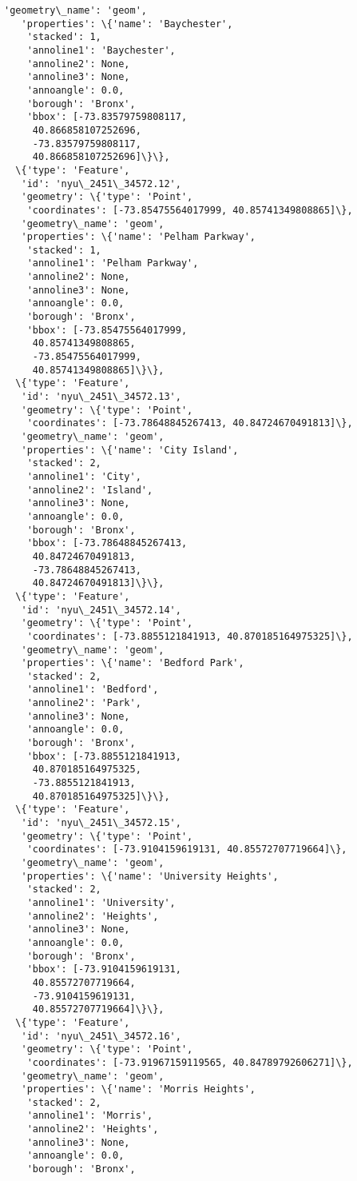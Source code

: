 \documentclass[11pt]{article}
\begin{document}
\begin{tcolorbox}[breakable, size=fbox, boxrule=.5pt, pad at break*=1mm, opacityfill=0]
\begin{Verbatim}[commandchars=\\\{\}]
   'geometry\_name': 'geom',
   'properties': \{'name': 'Baychester',
    'stacked': 1,
    'annoline1': 'Baychester',
    'annoline2': None,
    'annoline3': None,
    'annoangle': 0.0,
    'borough': 'Bronx',
    'bbox': [-73.83579759808117,
     40.866858107252696,
     -73.83579759808117,
     40.866858107252696]\}\},
  \{'type': 'Feature',
   'id': 'nyu\_2451\_34572.12',
   'geometry': \{'type': 'Point',
    'coordinates': [-73.85475564017999, 40.85741349808865]\},
   'geometry\_name': 'geom',
   'properties': \{'name': 'Pelham Parkway',
    'stacked': 1,
    'annoline1': 'Pelham Parkway',
    'annoline2': None,
    'annoline3': None,
    'annoangle': 0.0,
    'borough': 'Bronx',
    'bbox': [-73.85475564017999,
     40.85741349808865,
     -73.85475564017999,
     40.85741349808865]\}\},
  \{'type': 'Feature',
   'id': 'nyu\_2451\_34572.13',
   'geometry': \{'type': 'Point',
    'coordinates': [-73.78648845267413, 40.84724670491813]\},
   'geometry\_name': 'geom',
   'properties': \{'name': 'City Island',
    'stacked': 2,
    'annoline1': 'City',
    'annoline2': 'Island',
    'annoline3': None,
    'annoangle': 0.0,
    'borough': 'Bronx',
    'bbox': [-73.78648845267413,
     40.84724670491813,
     -73.78648845267413,
     40.84724670491813]\}\},
  \{'type': 'Feature',
   'id': 'nyu\_2451\_34572.14',
   'geometry': \{'type': 'Point',
    'coordinates': [-73.8855121841913, 40.870185164975325]\},
   'geometry\_name': 'geom',
   'properties': \{'name': 'Bedford Park',
    'stacked': 2,
    'annoline1': 'Bedford',
    'annoline2': 'Park',
    'annoline3': None,
    'annoangle': 0.0,
    'borough': 'Bronx',
    'bbox': [-73.8855121841913,
     40.870185164975325,
     -73.8855121841913,
     40.870185164975325]\}\},
  \{'type': 'Feature',
   'id': 'nyu\_2451\_34572.15',
   'geometry': \{'type': 'Point',
    'coordinates': [-73.9104159619131, 40.85572707719664]\},
   'geometry\_name': 'geom',
   'properties': \{'name': 'University Heights',
    'stacked': 2,
    'annoline1': 'University',
    'annoline2': 'Heights',
    'annoline3': None,
    'annoangle': 0.0,
    'borough': 'Bronx',
    'bbox': [-73.9104159619131,
     40.85572707719664,
     -73.9104159619131,
     40.85572707719664]\}\},
  \{'type': 'Feature',
   'id': 'nyu\_2451\_34572.16',
   'geometry': \{'type': 'Point',
    'coordinates': [-73.91967159119565, 40.84789792606271]\},
   'geometry\_name': 'geom',
   'properties': \{'name': 'Morris Heights',
    'stacked': 2,
    'annoline1': 'Morris',
    'annoline2': 'Heights',
    'annoline3': None,
    'annoangle': 0.0,
    'borough': 'Bronx',

\end{Verbatim}
\end{tcolorbox}
\end{document}
